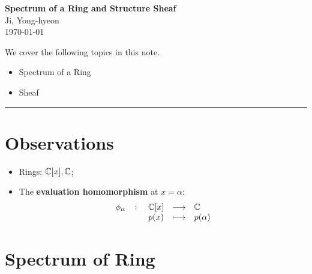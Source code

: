 \documentclass[11pt,openany]{article}
\begin{document}
\begin{center}
	\huge\textbf{Spectrum of a Ring and Structure Sheaf}\\
	\vspace{0.5em}
	\large{Ji, Yong-hyeon}\\
	\vspace{0.5em}
	\normalsize{\today}\\
\end{center}
We cover the following topics in this note.
\begin{itemize}
	\item Spectrum of a Ring
	\item Sheaf
\end{itemize}
\hrule\vspace{12pt}

\section{Observations}
\begin{center}
\end{center}
\begin{itemize}
	\item Rings: $\mathbb{C}[x],\mathbb{C}$;
	\item The \textbf{evaluation homomorphism} at $x=\alpha$: \[
	\fullfunction{\phi_\alpha}{\C[x]}{\C}{p(x)}{p(\alpha)}
	\]
\end{itemize}

\section*{Spectrum of Ring}
\end{document}
